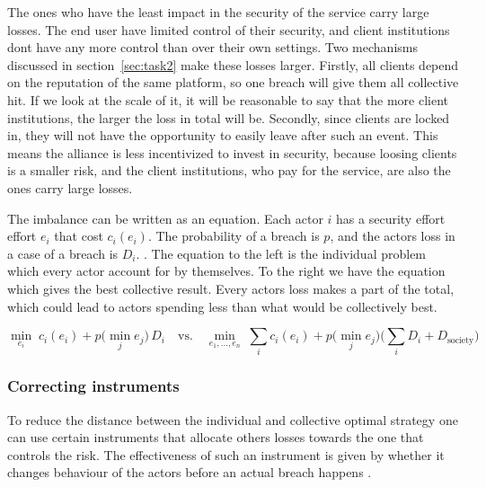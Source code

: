 The ones who have the least impact in the security of the service carry large losses. The end user have limited control of their security, and client institutions dont have any more control than over their own settings. Two mechanisms discussed in section~\ref{sec:task2} make these losses larger. Firstly, all clients depend on the reputation of the same platform, so one breach will give them all collective hit. If we look at the scale of it, it will be reasonable to say that the more client institutions, the larger the loss in total will be. Secondly, since clients are locked in, they will not have the opportunity to easily leave after such an event. This means the alliance is less incentivized to invest in security, because loosing clients is a smaller risk, and the client institutions, who pay for the service, are also the ones carry large losses.


The imbalance can be written as an equation. Each actor $i$ has a security effort
effort $e_i$ that cost $c_i(e_i)$. The probability of a breach is $p$, and the actors loss in a case of a breach is $D_i$. \parencite[slide 15]{kianpour2026slides}. The equation to the left is the individual problem which every actor account for by themselves. To the right we have the equation which gives the best collective result. Every actors loss makes a part of the total, which could lead to actors spending less than what would be collectively best.

\begin{equation}
  \min_{e_i}\; c_i(e_i) + p\big(\min_j e_j\big)\,D_i
  \quad\text{vs.}\quad
  \min_{e_1,\dots,e_n}\; \sum_i c_i(e_i)
  + p\big(\min_j e_j\big)\Big(\sum_i D_i + D_{\text{society}}\Big)
\end{equation}

\subsubsection{Correcting instruments}

To reduce the distance between the individual and collective optimal strategy one can use certain instruments that allocate others losses towards the one that controls the risk. The effectiveness of such an instrument is given by whether it changes behaviour of the actors before an actual breach happens \parencite[slide 26]{kianpour2026slides}.

